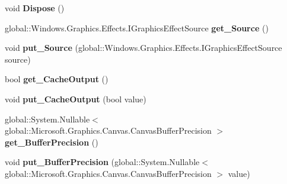 \begin{DoxyCompactItemize}
void {\bfseries Dispose} ()
\item 
\mbox{\label{class_microsoft_1_1_graphics_1_1_canvas_1_1_effects_1_1_un_premultiply_effect_a8edd8d7c36e87f9f8d1187028b644c4f}} 
global\+::\+Windows.\+Graphics.\+Effects.\+I\+Graphics\+Effect\+Source {\bfseries get\+\_\+\+Source} ()
\item 
\mbox{\label{class_microsoft_1_1_graphics_1_1_canvas_1_1_effects_1_1_un_premultiply_effect_a20525045ca936b234efc32a3132f5562}} 
void {\bfseries put\+\_\+\+Source} (global\+::\+Windows.\+Graphics.\+Effects.\+I\+Graphics\+Effect\+Source source)
\item 
\mbox{\label{class_microsoft_1_1_graphics_1_1_canvas_1_1_effects_1_1_un_premultiply_effect_a256aeca5e043b39b008fe14fe263583b}} 
bool {\bfseries get\+\_\+\+Cache\+Output} ()
\item 
\mbox{\label{class_microsoft_1_1_graphics_1_1_canvas_1_1_effects_1_1_un_premultiply_effect_ac8a6cc3add216c45f334769bf96b5e90}} 
void {\bfseries put\+\_\+\+Cache\+Output} (bool value)
\item 
\mbox{\label{class_microsoft_1_1_graphics_1_1_canvas_1_1_effects_1_1_un_premultiply_effect_af611030c9f4e93976a293ee18873ae1c}} 
global\+::\+System.\+Nullable$<$ global\+::\+Microsoft.\+Graphics.\+Canvas.\+Canvas\+Buffer\+Precision $>$ {\bfseries get\+\_\+\+Buffer\+Precision} ()
\item 
\mbox{\label{class_microsoft_1_1_graphics_1_1_canvas_1_1_effects_1_1_un_premultiply_effect_a459da2cfa5757c7727e0da37b97acd87}} 
void {\bfseries put\+\_\+\+Buffer\+Precision} (global\+::\+System.\+Nullable$<$ global\+::\+Microsoft.\+Graphics.\+Canvas.\+Canvas\+Buffer\+Precision $>$ value)
\item 
\mbox{\label{class_microsoft_1_1_graphics_1_1_canvas_1_1_effects_1_1_un_premultiply_effect_a778a8d89ab683f56a9d40713401d7e6f}} 

\end{DoxyCompactItemize}
